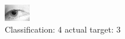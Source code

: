\begin{figure}[h!]
\begin{center}
\includegraphics[width=0.60\columnwidth]{figures/ID1417_class_4_target_3.png}
\end{center}
\caption{ Classification: 4 actual target: 3}
\label{fig:ID1417_class_4_target_3}
\end{figure}
